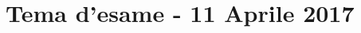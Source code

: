 \documentclass[\main/main.tex]{subfiles}
\begin{document}
\section{Tema d'esame - 11 Aprile 2017}


\clearpage

\clearpage

\clearpage

\clearpage

\clearpage

\clearpage

\end{document}
